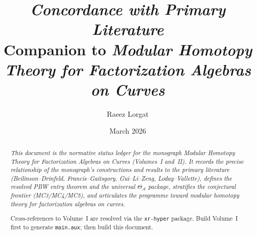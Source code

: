 \documentclass[11pt]{memoir}
\title{\textit{Concordance with Primary Literature}\\[0.5em]
\large Companion to \textit{Modular Homotopy Theory for Factorization Algebras on Curves}}
\author{Raeez Lorgat}
\date{March 2026}
\newcommand{\cA}{\mathcal{A}}
\begin{document}
\maketitle

\begin{abstract}
\itshape\noindent
This document is the normative status ledger for the monograph
\textit{Modular Homotopy Theory for Factorization Algebras on Curves}
(Volumes~I and~II).  It records the precise relationship of the
monograph's constructions and results to the primary literature
(Beilinson--Drinfeld, Francis--Gaitsgory, Gui--Li--Zeng,
Loday--Vallette), defines the resolved PBW entry theorem and the
universal $\Theta_{\cA}$ package, stratifies the conjectural frontier
(MC3/MC4/MC5), and articulates the programme toward modular homotopy
theory for factorization algebras on curves.

\medskip\noindent
Cross-references to Volume~I are resolved via the \texttt{xr-hyper}
package.  Build Volume~I first to generate \texttt{main.aux}; then
build this document.
\end{abstract}

\tableofcontents


\end{document}

